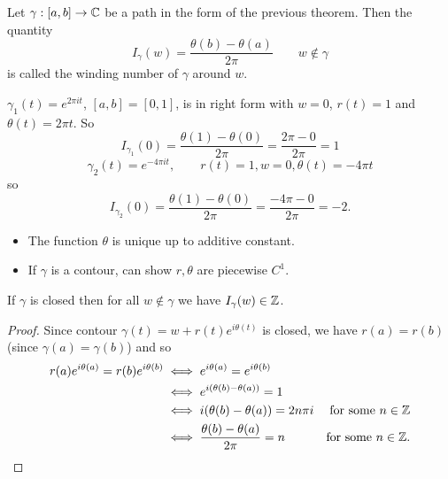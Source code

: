 \documentclass[10pt, a4paper]{article}
\begin{document}
\begin{definition}
    Let $\gamma : [a, b] \to \mathbb{C}$ be a path in the form of the previous theorem.
    Then the quantity
    \[
    I_{\gamma}(w) = \frac{\theta(b) - \theta(a)}{2\pi}\qquad w \notin \gamma
    \]
    is called the winding number of $\gamma$ around $w$.
\end{definition}

\begin{example}
    $\gamma_1(t) = e ^ {2\pi it}$,
    $[a, b] = [0, 1]$,
    is in right form with $w = 0$,
    $r(t) = 1$ and $\theta(t) = 2\pi t$.
    So
    \[
    I_{\gamma_1}(0) = \frac{\theta(1) - \theta(0)}{2\pi} = \frac{2\pi - 0}{2\pi} = 1
    \]
    \[
    \gamma_2(t) = e ^ {-4\pi it},\qquad r(t) = 1, w = 0, \theta(t) = -4\pi t
    \]
    so
    \[
    I_{\gamma_2}(0) = \frac{\theta(1) - \theta(0)}{2\pi} = \frac{-4\pi - 0}{2\pi} = -2.
    \]
\end{example}

\begin{remark}\phantom{}
    \begin{itemize}
        \item The function $\theta$ is unique up to additive constant.

        \item If $\gamma$ is a contour,
        can show $r, \theta$ are piecewise $C ^ 1$.
    \end{itemize}
\end{remark}

\begin{proposition}
    If $\gamma$ is closed then for all $w \notin \gamma$ we have $I_{\gamma}(w) \in \mathbb{Z}$.

    \begin{proof}
        Since contour $\gamma(t) = w + r(t)e ^ {i\theta(t)}$ is closed,
        we have $r(a) = r(b)$
        (since $\gamma(a) = \gamma(b)$)
        and so
        \begin{align*}
            r(a)e ^ {i\theta(a)} = r(b)e ^ {i\theta(b)} &\iff e ^ {i\theta(a)} = e ^ {i\theta(b)} \\
            &\iff e ^ {i(\theta(b) - \theta(a))} = 1 \\
            &\iff i(\theta(b) - \theta(a)) = 2n\pi i &\text{for some  $n \in \mathbb{Z}$} \\
            &\iff \frac{\theta(b) - \theta(a)}{2\pi} = n&\text{for some $n \in \mathbb{Z}$}.
        \end{align*}
    \end{proof}
\end{proposition}
\end{document}
